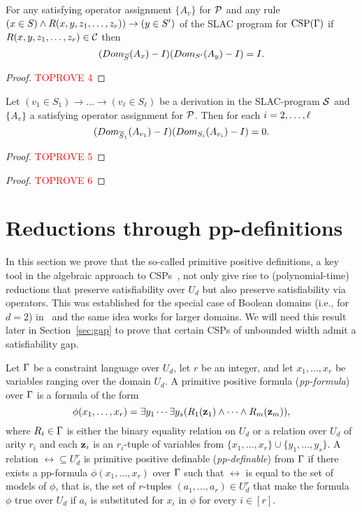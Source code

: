 \documentclass[11pt,letter]{article}
\begin{document}
\begin{lemma}\label{lem:derivation-poly}
For any satisfying operator assignment $\{A_v\}$ for ${\mathcal P}$ and any rule $(x\in S)\wedge R(x,y,z _1,\ldots, z _{r}))\to (y\in S')$ of the SLAC program for ${\rm CSP}(\Gamma)$ if 
$R(x,y,z _1,\ldots, z _{r})\in{\mathcal C}$ then 
\[
(Dom_{\overline S}(A_x)-I)(Dom_{S'}(A_y)-I)=I.
\]
\end{lemma}
\begin{proof}\textcolor{red}{TOPROVE 4}\end{proof}

\begin{lemma}\label{lem:transitive-poly}
Let $(v_1\in S_1)\to\dots\to(v_\ell\in S_\ell)$ be a derivation in the SLAC-program ${\mathcal S}$ and $\{A_v\}$ a satisfying operator assignment for ${\mathcal P}$. 
Then for each $i=2,\ldots,\ell$
\[
(Dom_{\overline S_1}(A_{v_1})-I)(Dom_{S_i}(A_{v_i})-I)=0.
\]
\end{lemma}
\begin{proof}\textcolor{red}{TOPROVE 5}\end{proof}

\begin{proof}\textcolor{red}{TOPROVE 6}\end{proof}
 
\section{Reductions through pp-definitions}\label{sec:operator-pp}

In this section we prove that the so-called primitive positive definitions, a key tool in the
algebraic approach to CSPs~\cite{Bulatov05:classifying}, not only give rise to
(polynomial-time) reductions that preserve satisfiability over $U_d$ but also
preserve satisfiability via operators. This was
established for the special case of Boolean domains (i.e., for $d=2$)
in~\cite{AKS19:jcss} and the same idea works for larger domains. We will need
this result later in Section~\ref{sec:gap} to prove that certain CSPs of 
unbounded width admit a satisfiability gap.

Let $\Gamma$ be a constraint language over $U_d$, let $r$ be an integer, and
let $x_1,\ldots,x_r$ be variables ranging over the domain $U_d$. A primitive
positive formula (\emph{pp-formula}) over $\Gamma$ is a formula of the form
\begin{equation}\label{eq:pp-formula}
  \phi(x_1,\ldots,x_r)=\exists y_1\cdots\exists y_s(R_1({\bf z}_1)\wedge\cdots\wedge
  R_m({\bf z}_m)),
\end{equation}
where $R_i\in\Gamma$ is either the binary equality relation on $U_d$ or a relation over $U_d$ of arity $r_i$ and each ${\bf z}_i$ is an $r_i$-tuple of variables from
$\{x_1,\ldots,x_r\}\cup\{y_1,\ldots,y_s\}$.
A relation $\rel\subseteq U_d^r$ is primitive positive definable
(\emph{pp-definable}) from $\Gamma$ if there
exists a pp-formula $\phi(x_1,\ldots,x_r)$ over $\Gamma$ such that $\rel$ is equal to the set of
models of $\phi$, that is, the set of $r$-tuples $(a_1,\ldots,a_r)\in U_d^r$
that make the formula $\phi$ true over $U_d$ if $a_i$ is
substituted for $x_i$ in $\phi$ for every $i\in [r]$.
\end{document}

